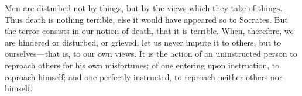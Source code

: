 Men are disturbed not by things, but by the views which they take of
things. Thus death is nothing terrible, else it would have appeared so to
Socrates. But the terror consists in our notion of death, that it is
terrible. When, therefore, we are hindered or disturbed, or grieved, let
us never impute it to others, but to ourselves---that is, to our own views.
It is the action of an uninstructed person to reproach others for his own
misfortunes; of one entering upon instruction, to reproach himself; and
one perfectly instructed, to reproach neither others nor himself.
